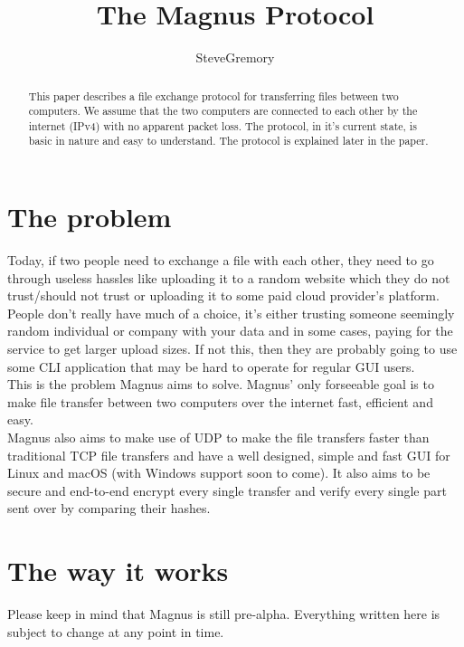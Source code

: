 \documentclass{article}
\title{The Magnus Protocol}
\author{SteveGremory}
\begin{document}
\maketitle

\begin{abstract}
      This paper describes a file exchange protocol for transferring files between two computers.
      We assume that the two computers are connected to each other by the internet (IPv4)
      with no apparent packet loss. The protocol, in it's current state, is basic in nature
      and easy to understand. The protocol is explained later in the paper.
\end{abstract}

\section{The problem}

Today, if two people need to exchange a file with each other, they need to go
through useless hassles like uploading it to a random website which they do not
trust/should not trust or uploading it to some paid cloud provider's platform.
\\

People don't really have much of a choice, it's either trusting someone
seemingly random individual or company with your data and in some cases, paying
for the service to get larger upload sizes. If not this, then they are probably
going to use some CLI application that may be hard to operate for regular GUI
users. \\

This is the problem Magnus aims to solve. Magnus' only forseeable goal is to
make file transfer between two computers over the internet fast, efficient and
easy. \\

Magnus also aims to make use of UDP to make the file transfers faster than
traditional TCP file transfers and have a well designed, simple and fast GUI
for Linux and macOS (with Windows support soon to come). It also aims to be
secure and end-to-end encrypt every single transfer and verify every single
part sent over by comparing their hashes. \\

\section{The way it works}

Please keep in mind that Magnus is still pre-alpha. Everything written here is
subject to change at any point in time. \\
\end{document}
